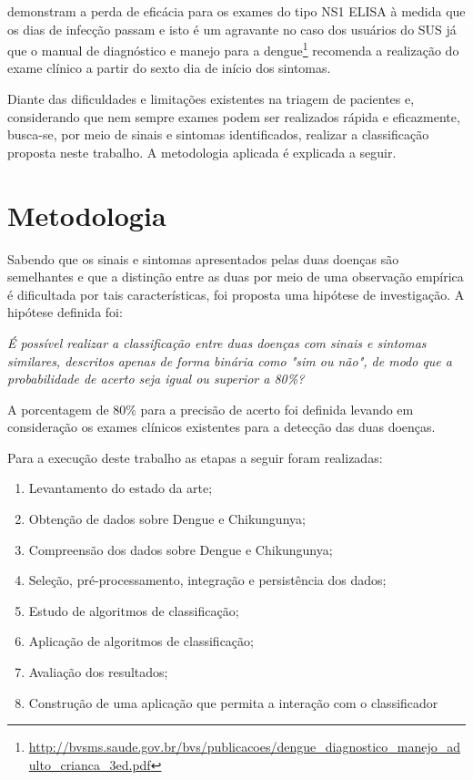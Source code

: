  demonstram a perda de eficácia para os exames do tipo NS1 ELISA à medida que os dias de infecção passam e isto é um agravante no caso dos usuários do SUS já que o manual de diagnóstico e manejo para a dengue\footnote{\url{http://bvsms.saude.gov.br/bvs/publicacoes/dengue_diagnostico_manejo_adulto_crianca_3ed.pdf}} recomenda a realização do exame clínico a partir do sexto dia de início dos sintomas.

Diante das dificuldades e limitações existentes na triagem de pacientes e, considerando que nem sempre exames podem ser realizados rápida e eficazmente, busca-se, por meio de sinais e sintomas identificados, realizar a classificação proposta neste trabalho. A metodologia aplicada é explicada a seguir.

\section{Metodologia}
Sabendo que os sinais e sintomas apresentados pelas duas doenças são semelhantes e que a distinção entre as duas por meio de uma observação empírica é dificultada por tais características, foi proposta uma hipótese de investigação. A hipótese definida foi:

\textit{É possível realizar a classificação entre duas doenças com sinais e sintomas similares, descritos apenas de forma binária como "sim ou não", de modo que a probabilidade de acerto seja igual ou superior a 80\%?}

A porcentagem de 80\% para a precisão de acerto foi definida levando em consideração os exames clínicos existentes para a detecção das duas doenças.

Para a execução deste trabalho as etapas a seguir foram realizadas:

\begin{enumerate}[label=\roman*]
 \item Levantamento do estado da arte;
 \item Obtenção de dados sobre Dengue e Chikungunya;
 \item Compreensão dos dados sobre Dengue e Chikungunya;
 \item Seleção, pré-processamento, integração e persistência dos dados;
 \item Estudo de algoritmos de classificação;
 \item Aplicação de algoritmos de classificação;
 \item Avaliação dos resultados;
 \item Construção de uma aplicação que permita a interação com o classificador
\end{enumerate}


